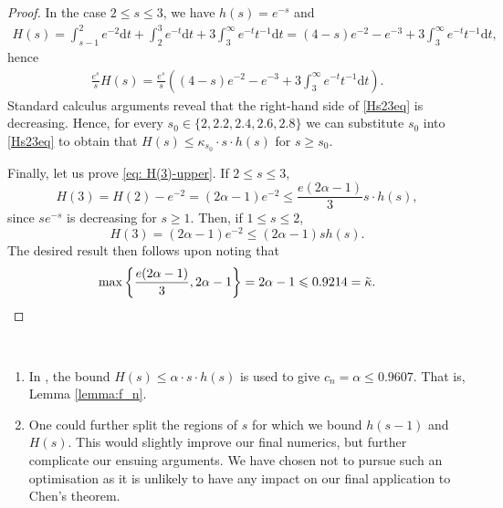 \documentclass[12pt]{amsart}
\begin{document}
\begin{proof}
In the case $2\le s\le 3$, we have $h(s) = e^{-s}$ and 
\begin{align*}
    H(s) = \int_{s-1}^2 e^{-2} \mathrm{d}t + \int_{2}^3 e^{-t} \mathrm{d}t + 3 \int_{3}^{\infty} e^{-t} t^{-1} \mathrm{d}t = (4-s) e^{-2} - e^{-3} + 3\int_{3}^{\infty} e^{-t} t^{-1} \mathrm{d}t,
\end{align*}
hence
\begin{align}\label{Hs23eq}
    \frac{e^s}{s} H(s) = \frac{e^s}{s} \left((4-s) e^{-2} - e^{-3} + 3\int_{3}^{\infty} e^{-t} t^{-1} \mathrm{d}t\right).
\end{align}
Standard calculus arguments reveal that the right-hand side of \eqref{Hs23eq} is decreasing. Hence, for every $s_0 \in \{2, 2.2, 2.4, 2.6, 2.8\}$ we can substitute $s_0$ into \eqref{Hs23eq} to obtain that $H(s)\le \kappa_{s_0}\cdot s\cdot h(s)$ for $s \ge s_0$.

Finally, let us prove \eqref{eq: H(3)-upper}. If $2\le s\le 3$,
\begin{equation*}
H(3)=H(2)-e^{-2}=(2\alpha-1)e^{-2}\le \frac{e(2\alpha-1)}{3}s\cdot h(s),
\end{equation*}
since $se^{-s}$ is decreasing for $s\ge 1$. Then, if $1\le s\le 2$,
\begin{equation*}
H(3)=(2\alpha-1)e^{-2}\le (2\alpha-1)sh(s).
\end{equation*}
The desired result then follows upon noting that
\begin{equation*}
    \max\left\{\frac{e(2\alpha-1)}{3},2\alpha-1\right\}=2\alpha-1\le 0.9214= \tilde{\kappa}.\qedhere
\end{equation*}
\end{proof}

\begin{remarks}\ 
\begin{enumerate}
    \item[1.] In \cite[Lemma 9.7]{Nathanson}, the bound $H(s)\le \alpha\cdot s\cdot h(s)$ is used to give $c_n=\alpha\le 0.9607$. That is, Lemma \ref{lemma:f_n}.
    \item[2.] One could further split the regions of $s$ for which we bound $h(s-1)$ and $H(s)$. This would slightly improve our final numerics, but further complicate our ensuing arguments. We have chosen not to pursue such an optimisation as it is unlikely to have any impact on our final application to Chen's theorem.
\end{enumerate}
\end{remarks}
\end{document}
